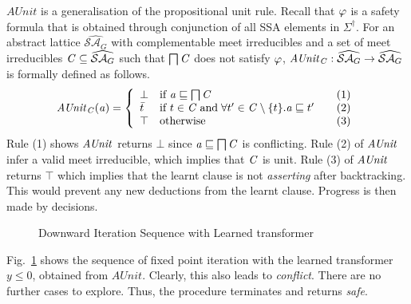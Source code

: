 %
$AUnit$ is a generalisation of the propositional unit rule.  
Recall that $\varphi$ is a safety formula that is obtained through 
conjunction of all SSA elements in $\Sigma^{\dagger}$. 
For an abstract lattice $\widehat{\mathcal{SA}_{G}}$ with
complementable meet irreducibles and a set of meet irreducibles $\mathit{C}
\subseteq \widehat{\mathcal{SA}_{G}}$ such that $\bigsqcap
\mathit{C}$ does not satisfy $\varphi$, $\mathit{AUnit}_{\mathit{C}}:
\widehat{\mathcal{SA}_G} \rightarrow \widehat{\mathcal{SA}_G}$ 
is formally defined as follows.
\[ \aunit_\conflictset(\absval) =
 \left\{\begin{array}{l@{\quad}l@{\qquad}l}
  \bot       & \text{if } \absval \sqsubseteq \bigsqcap \conflictset & (1)\\
  \bar{t}    & \text{if } t \in \conflictset \; \text{and} \; \forall t' \in \conflictset
  \setminus \{t\}. \absval  \sqsubseteq t' & (2) \\
  \top & \text{otherwise} & (3) \\
 \end{array}\right.
\]
%
Rule (1) shows $\mathit{AUnit}$ returns $\bot$ since 
$\mathit{a} \sqsubseteq \bigsqcap \mathit{C}$ is conflicting.  
Rule (2) of $\mathit{AUnit}$ infer a valid meet irreducible, 
which implies that $\mathit{C}$ is unit.  Rule (3) of  
$\mathit{AUnit}$ returns $\top$ which implies that the learnt clause is not 
{\em asserting} after backtracking.  This would prevent any new 
deductions from the learnt clause. Progress is then made by decisions. 
%
\begin{figure}[htbp]
\centering
\vspace*{-0.2cm}
\caption{Downward Iteration Sequence with Learned transformer \label{learning}}
\end{figure}
%
\begin{example}
Fig.~\ref{learning} shows the sequence of fixed point iteration with the learned
transformer $y \leq 0$, obtained from $AUnit$.  Clearly, this also leads to 
\emph{conflict}. There are no further cases to explore. Thus, the procedure 
terminates and returns \emph{safe}.
\end{example}
%

